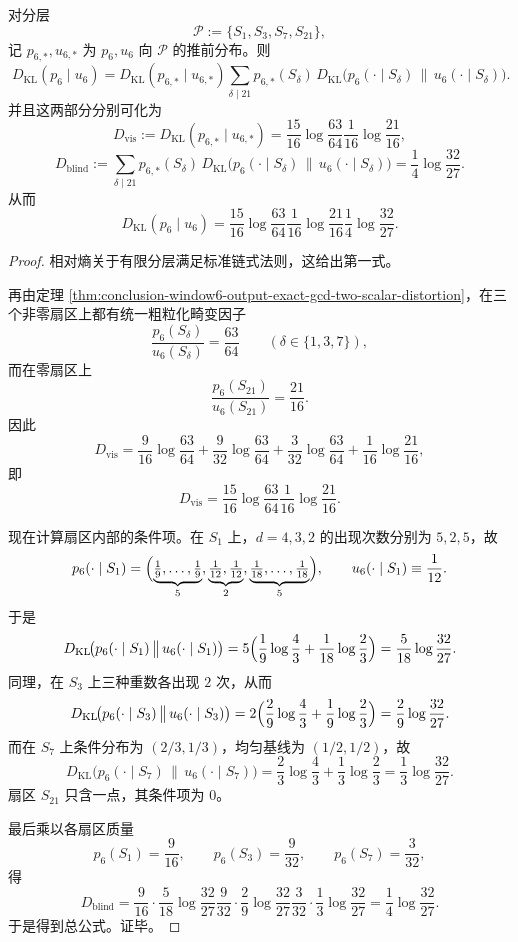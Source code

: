 \begin{theorem}\label{thm:conclusion-window6-output-kl-exact-gcd-chain-splitting}
对分层
\[
\mathscr P:=\{S_1,S_3,S_7,S_{21}\},
\]
记 \(p_{6,\ast},u_{6,\ast}\) 为 \(p_6,u_6\) 向 \(\mathscr P\) 的推前分布。则
\[
\boxed{\;
D_{\mathrm{KL}}(p_6\mid u_6)
=
D_{\mathrm{KL}}(p_{6,\ast}\mid u_{6,\ast})
\sum_{\delta\mid 21}
p_{6,\ast}(S_\delta)\,
D_{\mathrm{KL}}\!\bigl(p_6(\cdot\mid S_\delta)\,\big\|\,u_6(\cdot\mid S_\delta)\bigr).\;}
\]
并且这两部分分别可化为
\[
\boxed{\;
D_{\mathrm{vis}}
:=
D_{\mathrm{KL}}(p_{6,\ast}\mid u_{6,\ast})
=
\frac{15}{16}\log\frac{63}{64}
\frac{1}{16}\log\frac{21}{16},\;}
\]
\[
\boxed{\;
D_{\mathrm{blind}}
:=
\sum_{\delta\mid 21}
p_{6,\ast}(S_\delta)\,
D_{\mathrm{KL}}\!\bigl(p_6(\cdot\mid S_\delta)\,\big\|\,u_6(\cdot\mid S_\delta)\bigr)
=
\frac14\log\frac{32}{27}.\;}
\]
从而
\[
\boxed{\;
D_{\mathrm{KL}}(p_6\mid u_6)
=
\frac{15}{16}\log\frac{63}{64}
\frac{1}{16}\log\frac{21}{16}
\frac14\log\frac{32}{27}.\;}
\]
\end{theorem}
\begin{proof}
相对熵关于有限分层满足标准链式法则，这给出第一式。

再由定理 \ref{thm:conclusion-window6-output-exact-gcd-two-scalar-distortion}，在三个非零扇区上都有统一粗粒化畸变因子
\[
\frac{p_6(S_\delta)}{u_6(S_\delta)}=\frac{63}{64}
\qquad(\delta\in\{1,3,7\}),
\]
而在零扇区上
\[
\frac{p_6(S_{21})}{u_6(S_{21})}=\frac{21}{16}.
\]
因此
\[
D_{\mathrm{vis}}
=
\frac{9}{16}\log\frac{63}{64}
+\frac{9}{32}\log\frac{63}{64}
+\frac{3}{32}\log\frac{63}{64}
+\frac{1}{16}\log\frac{21}{16},
\]
即
\[
D_{\mathrm{vis}}
=
\frac{15}{16}\log\frac{63}{64}
\frac{1}{16}\log\frac{21}{16}.
\]

现在计算扇区内部的条件项。在 \(S_1\) 上，\(d=4,3,2\) 的出现次数分别为 \(5,2,5\)，故
\[
p_6(\cdot\mid S_1)=
\Bigl(\underbrace{\tfrac19,\dots,\tfrac19}_{5},
\underbrace{\tfrac1{12},\tfrac1{12}}_{2},
\underbrace{\tfrac1{18},\dots,\tfrac1{18}}_{5}\Bigr),
\qquad
u_6(\cdot\mid S_1)\equiv \frac1{12}.
\]
于是
\[
D_{\mathrm{KL}}\!\bigl(p_6(\cdot\mid S_1)\,\big\|\,u_6(\cdot\mid S_1)\bigr)
=
5\Bigl(\frac19\log\frac43+\frac1{18}\log\frac23\Bigr)
=
\frac{5}{18}\log\frac{32}{27}.
\]
同理，在 \(S_3\) 上三种重数各出现 \(2\) 次，从而
\[
D_{\mathrm{KL}}\!\bigl(p_6(\cdot\mid S_3)\,\big\|\,u_6(\cdot\mid S_3)\bigr)
=
2\Bigl(\frac29\log\frac43+\frac19\log\frac23\Bigr)
=
\frac29\log\frac{32}{27}.
\]
而在 \(S_7\) 上条件分布为 \((2/3,1/3)\)，均匀基线为 \((1/2,1/2)\)，故
\[
D_{\mathrm{KL}}\!\bigl(p_6(\cdot\mid S_7)\,\big\|\,u_6(\cdot\mid S_7)\bigr)
=
\frac23\log\frac43+\frac13\log\frac23
=
\frac13\log\frac{32}{27}.
\]
扇区 \(S_{21}\) 只含一点，其条件项为 \(0\)。

最后乘以各扇区质量
\[
p_6(S_1)=\frac9{16},\qquad
p_6(S_3)=\frac9{32},\qquad
p_6(S_7)=\frac3{32},
\]
得
\[
D_{\mathrm{blind}}
=
\frac9{16}\cdot \frac{5}{18}\log\frac{32}{27}
\frac9{32}\cdot \frac29\log\frac{32}{27}
\frac3{32}\cdot \frac13\log\frac{32}{27}
=
\frac14\log\frac{32}{27}.
\]
于是得到总公式。证毕。
\end{proof}

